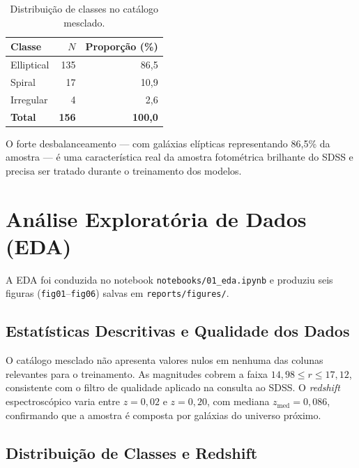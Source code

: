 \documentclass[12pt, a4paper]{article}
\begin{document}
\begin{table}[H]
  \centering
  \caption{Distribuição de classes no catálogo mesclado.}
  \label{tab:dist_classes}
  \begin{tabular}{lrr}
    \toprule
    \textbf{Classe} & \textbf{$N$} & \textbf{Proporção (\%)} \\
    \midrule
    Elliptical  & 135 & 86,5 \\
    Spiral      &  17 & 10,9 \\
    Irregular   &   4 &  2,6 \\
    \midrule
    \textbf{Total} & \textbf{156} & \textbf{100,0} \\
    \bottomrule
  \end{tabular}
\end{table}

O forte desbalanceamento --- com galáxias elípticas representando 86,5\% da
amostra --- é uma característica real da amostra fotométrica brilhante do SDSS
e precisa ser tratado durante o treinamento dos modelos.

\section{Análise Exploratória de Dados (EDA)}

A EDA foi conduzida no notebook \texttt{notebooks/01\_eda.ipynb} e produziu
seis figuras (\texttt{fig01}--\texttt{fig06}) salvas em \texttt{reports/figures/}.

\subsection{Estatísticas Descritivas e Qualidade dos Dados}

O catálogo mesclado não apresenta valores nulos em nenhuma das colunas
relevantes para o treinamento. As magnitudes cobrem a faixa $14{,}98 \leq r
\leq 17{,}12$, consistente com o filtro de qualidade aplicado na consulta ao
SDSS. O \textit{redshift} espectroscópico varia entre $z = 0{,}02$ e
$z = 0{,}20$, com mediana $z_\text{med} = 0{,}086$, confirmando que a amostra
é composta por galáxias do universo próximo.

\subsection{Distribuição de Classes e Redshift}
\end{document}
